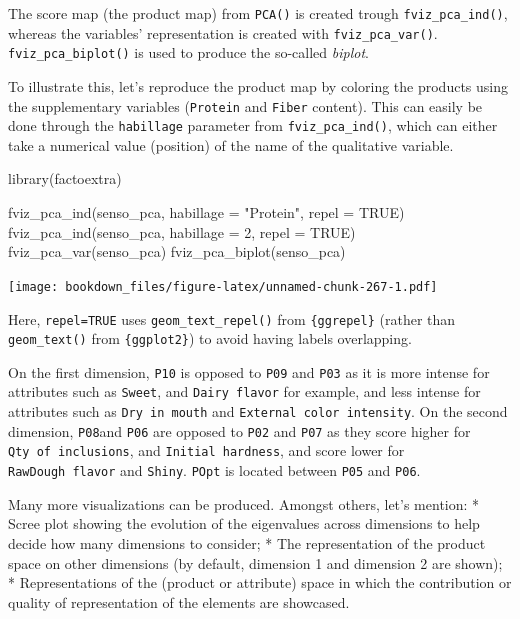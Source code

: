 \documentclass[
]{krantz}
\makeatletter
\newenvironment{Shaded}{\begin{snugshade}}{\end{snugshade}}
\newcommand{\AttributeTok}[1]{\textcolor[rgb]{0.61,0.61,0.61}{#1}}
\newcommand{\ConstantTok}[1]{\textcolor[rgb]{0,0,0}{#1}}
\newcommand{\DecValTok}[1]{\textcolor[rgb]{0.06,0.06,0.06}{#1}}
\newcommand{\FunctionTok}[1]{\textcolor[rgb]{0,0,0}{#1}}
\newcommand{\NormalTok}[1]{#1}
\newcommand{\StringTok}[1]{\textcolor[rgb]{0.5,0.5,0.5}{#1}}
\renewenvironment{quote}{\begin{VF}}{\end{VF}}
\newenvironment{kframe}{%
\medskip{}
\setlength{\fboxsep}{.8em}
 \def\at@end@of@kframe{}%
 \ifinner\ifhmode%
  \def\at@end@of@kframe{\end{minipage}}%
  \begin{minipage}{\columnwidth}%
 \fi\fi%
 \def\FrameCommand##1{\hskip\@totalleftmargin \hskip-\fboxsep
 \colorbox{shadecolor}{##1}\hskip-\fboxsep
     \hskip-\linewidth \hskip-\@totalleftmargin \hskip\columnwidth}%
 \MakeFramed {\advance\hsize-\width
   \@totalleftmargin\z@ \linewidth\hsize
   \@setminipage}}%
 {\par\unskip\endMakeFramed%
 \at@end@of@kframe}
\renewenvironment{Shaded}{\begin{kframe}}{\end{kframe}}
\makeatother
\begin{document}
The score map (the product map) from \texttt{PCA()} is created trough \texttt{fviz\_pca\_ind()}, whereas the variables' representation is created with \texttt{fviz\_pca\_var()}. \texttt{fviz\_pca\_biplot()} is used to produce the so-called \emph{biplot}.

To illustrate this, let's reproduce the product map by coloring the products using the supplementary variables (\texttt{Protein} and \texttt{Fiber} content). This can easily be done through the \texttt{habillage} parameter from \texttt{fviz\_pca\_ind()}, which can either take a numerical value (position) of the name of the qualitative variable.

\begin{Shaded}
\begin{Highlighting}[]
\FunctionTok{library}\NormalTok{(factoextra)}

\FunctionTok{fviz\_pca\_ind}\NormalTok{(senso\_pca, }\AttributeTok{habillage =} \StringTok{"Protein"}\NormalTok{, }\AttributeTok{repel =} \ConstantTok{TRUE}\NormalTok{)}
\FunctionTok{fviz\_pca\_ind}\NormalTok{(senso\_pca, }\AttributeTok{habillage =} \DecValTok{2}\NormalTok{, }\AttributeTok{repel =} \ConstantTok{TRUE}\NormalTok{)}
\FunctionTok{fviz\_pca\_var}\NormalTok{(senso\_pca)}
\FunctionTok{fviz\_pca\_biplot}\NormalTok{(senso\_pca)}
\end{Highlighting}
\end{Shaded}

\texttt{[image: bookdown\_files/figure-latex/unnamed-chunk-267-1.pdf]}

Here, \texttt{repel=TRUE} uses \texttt{geom\_text\_repel()} from \texttt{\{ggrepel\}} (rather than \texttt{geom\_text()} from \texttt{\{ggplot2\}}) to avoid having labels overlapping.

On the first dimension, \texttt{P10} is opposed to \texttt{P09} and \texttt{P03} as it is more intense for attributes such as \texttt{Sweet}, and \texttt{Dairy\ flavor} for example, and less intense for attributes such as \texttt{Dry\ in\ mouth} and \texttt{External\ color\ intensity}. On the second dimension, \texttt{P08}and \texttt{P06} are opposed to \texttt{P02} and \texttt{P07} as they score higher for \texttt{Qty\ of\ inclusions}, and \texttt{Initial\ hardness}, and score lower for \texttt{RawDough\ flavor} and \texttt{Shiny}. \texttt{POpt} is located between \texttt{P05} and \texttt{P06}.

\begin{quote}
Many more visualizations can be produced. Amongst others, let's mention:
* Scree plot showing the evolution of the eigenvalues across dimensions to help decide how many dimensions to consider;
* The representation of the product space on other dimensions (by default, dimension 1 and dimension 2 are shown);
* Representations of the (product or attribute) space in which the contribution or quality of representation of the elements are showcased.
\end{quote}
\end{document}
